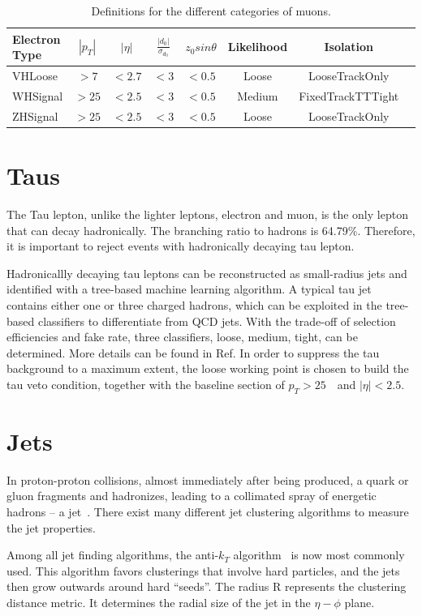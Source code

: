 \begin{table}[tbh]
    \centering
    \begin{tabular}{|l|c|c|c|c|c|c|c}
        \hline
        Electron Type & $|p_T|$ &$|\eta|$ & $\frac{|d_0|}{\sigma_{d_0}}$&$z_0 sin\theta$ & Likelihood &Isolation \\
        \hline
        VHLoose &$>7$&$<2.7$&$<3$&$<0.5$&Loose&LooseTrackOnly\\
        \hline
        WHSignal &$>25$&$<2.5$&$<3$&$<0.5$&Medium&FixedTrackTTTight\\
        \hline
        ZHSignal &$>25$&$<2.5$&$<3$&$<0.5$&Loose&LooseTrackOnly\\
        \hline
    \end{tabular}
    \caption{Definitions for the different categories of muons.}
    \label{tab:mu}
\end{table}

\section{Taus}
\label{sec:taus}

\par The Tau lepton, unlike the lighter leptons, electron and muon, 
is the only lepton that can decay hadronically. The branching ratio to hadrons is 64.79\%. Therefore, it is important to reject events with hadronically decaying tau lepton.

\par Hadronicallly decaying tau leptons can be reconstructed as small-radius jets and identified with a tree-based machine learning algorithm. A typical tau jet 
contains either one or three charged hadrons, which can be exploited in the tree-based classifiers to differentiate from QCD jets. With the trade-off of selection 
efficiencies and fake rate, three classifiers, loose, medium, tight, can be determined. More details can be found in Ref\cite{ATL-PHYS-PUB-2015-045}. 
In order to suppress the tau background to a maximum extent, the loose working point is chosen to build the tau veto condition, together with the baseline section of $p_T > 25$~\GeV~and $|\eta| < 2.5$.

\section{Jets}
\label{sec:jets}

\par In proton-proton collisions, almost immediately after being produced, a quark or gluon fragments and hadronizes, leading to a collimated spray of energetic hadrons -- 
a jet~\cite{Salam:2009jx}. There exist many different jet clustering algorithms to measure the jet properties. 
\par Among all jet finding algorithms, the anti-$k_T$ algorithm~\cite{Cacciari:2008gn} is now most commonly used. This algorithm favors clusterings that involve hard particles, 
and the jets then grow outwards around hard ``seeds''. The radius R represents the clustering distance metric. It determines the radial size of the jet in the $\eta-\phi$ plane.

